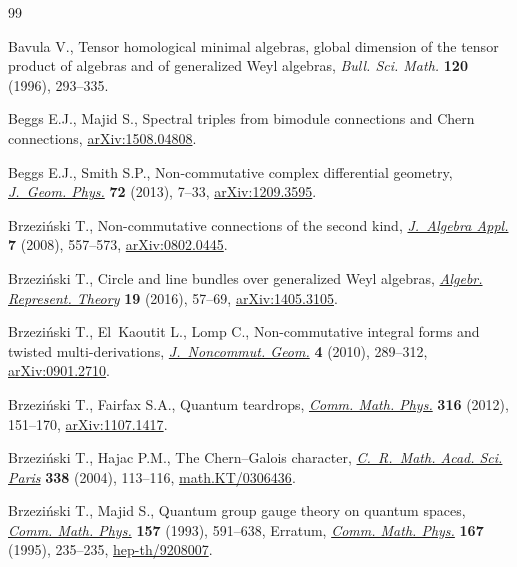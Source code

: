 \documentclass[10pt,a4paper]{amsart}
\numberwithin{equation}{section}
\begin{document}

\begin{thebibliography}{99}
\footnotesize\itemsep=0pt

Bavula V., Tensor homological minimal algebras, global dimension of the tensor
 product of algebras and of generalized {W}eyl algebras, \textit{Bull. Sci.
 Math.} \textbf{120} (1996), 293--335.

Beggs E.J., Majid S., Spectral triples from bimodule connections and {C}hern
 connections, \href{http://arxiv.org/abs/1508.04808}{arXiv:1508.04808}.

Beggs E.J., Smith S.P., Non-commutative complex dif\/ferential geometry,
 \href{http://dx.doi.org/10.1016/j.geomphys.2013.03.018}{\textit{J.~Geom. Phys.}} \textbf{72} (2013), 7--33, \href{http://arxiv.org/abs/1209.3595}{arXiv:1209.3595}.

Brzezi{\'n}ski T., Non-commutative connections of the second kind,
 \href{http://dx.doi.org/10.1142/S0219498808002977}{\textit{J.~Algebra Appl.}} \textbf{7} (2008), 557--573, \href{http://arxiv.org/abs/0802.0445}{arXiv:0802.0445}.

Brzezi{\'n}ski T., Circle and line bundles over generalized {W}eyl algebras,
 \href{http://dx.doi.org/10.1007/s10468-015-9562-7}{\textit{Algebr. Represent. Theory}} \textbf{19} (2016), 57--69,
 \href{http://arxiv.org/abs/1405.3105}{arXiv:1405.3105}.

Brzezi{\'n}ski T., El~Kaoutit L., Lomp C., Non-commutative integral forms and
 twisted multi-derivations, \href{http://dx.doi.org/10.4171/JNCG/56}{\textit{J.~Noncommut. Geom.}} \textbf{4} (2010),
 289--312, \href{http://arxiv.org/abs/0901.2710}{arXiv:0901.2710}.

Brzezi{\'n}ski T., Fairfax S.A., Quantum teardrops, \href{http://dx.doi.org/10.1007/s00220-012-1580-2}{\textit{Comm. Math. Phys.}}
 \textbf{316} (2012), 151--170, \href{http://arxiv.org/abs/1107.1417}{arXiv:1107.1417}.

Brzezi{\'n}ski T., Hajac P.M., The {C}hern--{G}alois character,
 \href{http://dx.doi.org/10.1016/j.crma.2003.11.009}{\textit{C.~R.~Math. Acad. Sci. Paris}} \textbf{338} (2004), 113--116,
 \href{http://arxiv.org/abs/math.KT/0306436}{math.KT/0306436}.

Brzezi{\'n}ski T., Majid S., Quantum group gauge theory on quantum spaces,
 \href{http://dx.doi.org/10.1007/BF02096884}{\textit{Comm. Math. Phys.}} \textbf{157} (1993), 591--638, {E}rratum,
 \href{http://dx.doi.org/10.1007/BF02099359}{\textit{Comm. Math. Phys.}}
 \textbf{167} (1995), 235--235, \href{http://arxiv.org/abs/hep-th/9208007}{hep-th/9208007}.


\end{thebibliography}
\end{document}
